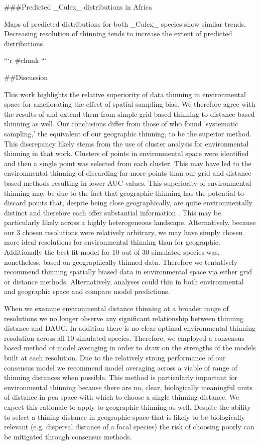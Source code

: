 ###Predicted _Culex_ distributions in Africa

Maps of predicted distributions for both _Culex_ species show similar trends. Decreasing resolution of thinning tends to increase the extent of predicted distributions. 

```{r}
#chunk
```


##Discussion 

This work highlights the relative superiority of data thinning in environmental space for ameliorating the effect of spatial sampling bias. We therefore agree with the results of \cite{Varela:2014ck} and extend them from simple grid based thinning to distance based thinning as well. Our conclusions differ from those of \cite{Fourcade:2014ka} who found 'systematic sampling,' the equivalent of our geographic thinning, to be the superior method. This discrepancy likely stems from the use of cluster analysis for environmental thinning in that work. Clusters of points in environmental space were identified and then a single point was selected from each cluster. This may have led to the environmental thinning of \cite{Fourcade:2014ka} discarding far more points than our grid and distance based methods resulting in lower AUC values. This superiority of environmental thinning may be due to the fact that geographic thinning has the potential to discard points that, despite being close geographically, are quite environmentally distinct and therefore each offer substantial information \cite{Varela:2014ck}. This may be particularly likely across a highly heterogeneous landscape. Alternatively, because our 3 chosen resolutions were relatively arbitrary, we may have simply chosen more ideal resolutions for environmental thinning than for geographic. Additionally the best fit model for 10 out of 30 simulated species was, nonetheless, based on geographically thinned data.  Therefore we tentatively recommend thinning spatially biased data in environmental space via either grid or distance methods. Alternatively, analyses could thin in both environmental and geographic space and compare model predictions. 

When we examine environmental distance thinning at a broader range of resolutions we no longer observe any significant relationship between thinning distance and DAUC. In addition there is no clear optimal environmental thinning resolution across all 10 simulated species. Therefore, we employed a consensus based method of model averaging in order to draw on the strengths of the models built at each resolution. Due to the relatively strong performance of our consensus model we recommend model averaging across a viable of range of thinning distances when possible. This method is particularly important for environmental thinning because there are no, clear, biologically meaningful units of distance in pca space with which to choose a single thinning distance. We expect this rationale to apply to geographic thinning as well. Despite the ability to select a thining distance in geographic space that is likely to be biologically relevant (e.g. dispersal distance of a focal species) the risk of choosing poorly can be mitigated through consensus methods.

